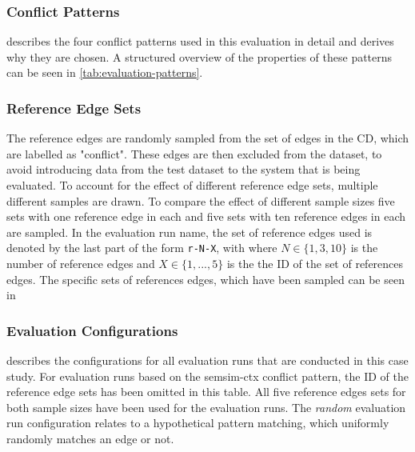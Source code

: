 \documentclass[11pt]{scrreprt}
\begin{document}

\subsubsection{Conflict Patterns}
 describes the four conflict patterns used in this evaluation in detail and derives why they are chosen. A structured overview of the properties of these patterns can be seen in \cref{tab:evaluation-patterns}. 

\subsubsection{Reference Edge Sets}
The reference edges are randomly sampled from the set of edges in the CD, which are labelled as "conflict". These edges are then excluded from the dataset, to avoid introducing data from the test dataset to the system that is being evaluated. To account for the effect of different reference edge sets, multiple different samples are drawn. To compare the effect of different sample sizes five sets with one reference edge in each and five sets with ten reference edges in each are sampled. In the evaluation run name, the set of reference edges used is denoted by the last part of the form \texttt{r-N-X}, with where \(N \in \{1, 3, 10\}\) is the number of reference edges and \(X \in \{1, ..., 5\}\) is the the ID of the set of references edges. The specific sets of references edges, which have been sampled can be seen in 

\subsubsection{Evaluation Configurations}
 describes the configurations for all evaluation runs that are conducted in this case study. For evaluation runs based on the semsim-ctx conflict pattern, the ID of the reference edge sets has been omitted in this table. All five reference edges sets for both sample sizes have been used for the evaluation runs. The \textit{random} evaluation run configuration relates to a hypothetical pattern matching, which uniformly randomly matches an edge or not.
\end{document}
